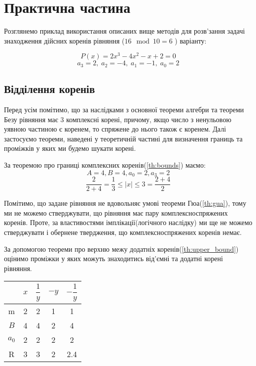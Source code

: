 \section*{\centering Практична частина}

Розглянемо приклад використання описаних
вище методів для розв'зання задачі знаходження
дійсних коренів рівняння ($16 \mod{10}= 6$ ) варіанту:

\[
    P(x) = 2x^3 - 4x^2 - x + 2 = 0
\]
\[
    a_3 = 2, \; a_2 = -4, \; a_1 = -1, \; a_0 = 2
\]

\subsection*{Відділення коренів}

Перед усім помітимо, що за наслідками з основної теореми алгебри
та теореми Безу рівняння має 3 комплексні корені, причому,
якщо число з ненульовою уявною частиною є коренем, то спряжене до нього
також є коренем.
Далі застосуємо теореми, наведені у теоретичній частині для
визначення границь та проміжків у яких ми будемо шукати корені.

За теоремою про границі комплексних коренів(\ref{th:bounds}) маємо:
\[
    A = 4, B = 4, a_0 = 2, a_3 = 2
\]
\[
    \frac{2}{2+4} = \frac{1}{3} \leq |x| \leq 3 = \frac{2+4}{2}
\]

Помітимо, що задане рівняння не вдовольняє умові теореми Гюа(\ref{th:gua}),
тому ми не можемо стверджувати, що рівняння має пару комплексноспряжених коренів.
Проте, за властивостями імплікації(логічного наслідку)
ми ще не можемо стверджувати і обернене твердження, що
комплексноспряжених коренів немає.

За допомогою теореми про верхню межу додатніх коренів(\ref{th:upper_bound})
оцінимо проміжки у яких можуть знаходитись від'ємні та
додатні корені рівняння.

\begin{table}[h!]
    \centering
    \begin{tabular}{|c|c|c|c|c|}
        \hline
        & $x$ & $\dfrac{1}{y}$ & $-y$ & $-\dfrac{1}{y}$ \\
        \hline
        m & 2 & 2 & 1 & 1 \\
        \hline
        $B$ & 4 & 4 & 2 & 4 \\
        \hline
        $a_0$ & 2 & 2 & 2 & 2 \\
        \hline
        R & 3 & 3 & 2 & 2.4 \\
        \hline
    \end{tabular}
\end{table}

